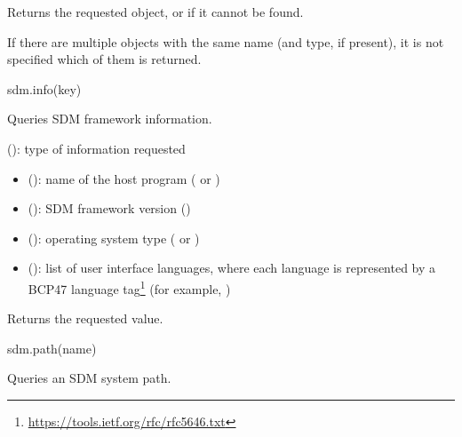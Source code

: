 \documentclass[a4paper,12pt,twoside,extrafontsizes]{memoir}
\begin{document}
\begin{funcret}
	Returns the requested object, or  if it cannot be found.
\end{funcret}

\begin{funcremarks}
	If there are multiple objects with the same name (and type, if present), it is not specified which of them is returned.
\end{funcremarks}


\begin{luafuncprototype}
sdm.info(key)
\end{luafuncprototype}

\begin{funcdescr}
	Queries SDM framework information.
\end{funcdescr}

\begin{funcparams}
	 (): type of information requested
	\begin{itemize}
		\item {} (): name of the host program ( or )
		\item {} (): SDM framework version ()
		\item {} (): operating system type ( or )
		\item {} (): list of user interface languages, where each language is represented by a BCP47 language tag\footnote{\url{https://tools.ietf.org/rfc/rfc5646.txt}} (for example, )
	\end{itemize}
\end{funcparams}

\begin{funcret}
	Returns the requested value.
\end{funcret}


\begin{luafuncprototype}
	sdm.path(name)
\end{luafuncprototype}

\begin{funcdescr}
	Queries an SDM system path.
\end{funcdescr}
\end{document}

